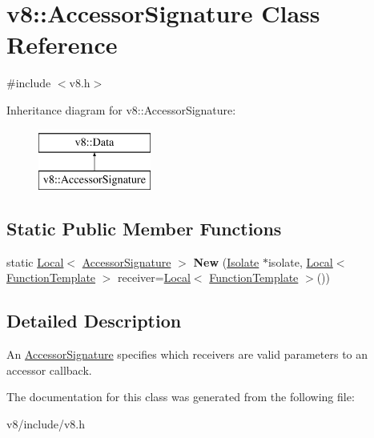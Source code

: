 \hypertarget{classv8_1_1AccessorSignature}{}\section{v8\+:\+:Accessor\+Signature Class Reference}
\label{classv8_1_1AccessorSignature}


{\ttfamily \#include $<$v8.\+h$>$}

Inheritance diagram for v8\+:\+:Accessor\+Signature\+:\begin{figure}[H]
\begin{center}
\leavevmode
\includegraphics[height=2.000000cm]{classv8_1_1AccessorSignature}
\end{center}
\end{figure}
\subsection*{Static Public Member Functions}
\begin{DoxyCompactItemize}
\item 
\hypertarget{classv8_1_1AccessorSignature_a2d7f28b404be5ecdb501aaf572a7ee52}{}static \hyperlink{classv8_1_1Local}{Local}$<$ \hyperlink{classv8_1_1AccessorSignature}{Accessor\+Signature} $>$ {\bfseries New} (\hyperlink{classv8_1_1Isolate}{Isolate} $\ast$isolate, \hyperlink{classv8_1_1Local}{Local}$<$ \hyperlink{classv8_1_1FunctionTemplate}{Function\+Template} $>$ receiver=\hyperlink{classv8_1_1Local}{Local}$<$ \hyperlink{classv8_1_1FunctionTemplate}{Function\+Template} $>$())\label{classv8_1_1AccessorSignature_a2d7f28b404be5ecdb501aaf572a7ee52}

\end{DoxyCompactItemize}


\subsection{Detailed Description}
An \hyperlink{classv8_1_1AccessorSignature}{Accessor\+Signature} specifies which receivers are valid parameters to an accessor callback. 

The documentation for this class was generated from the following file\+:\begin{DoxyCompactItemize}
\item 
v8/include/v8.\+h\end{DoxyCompactItemize}
